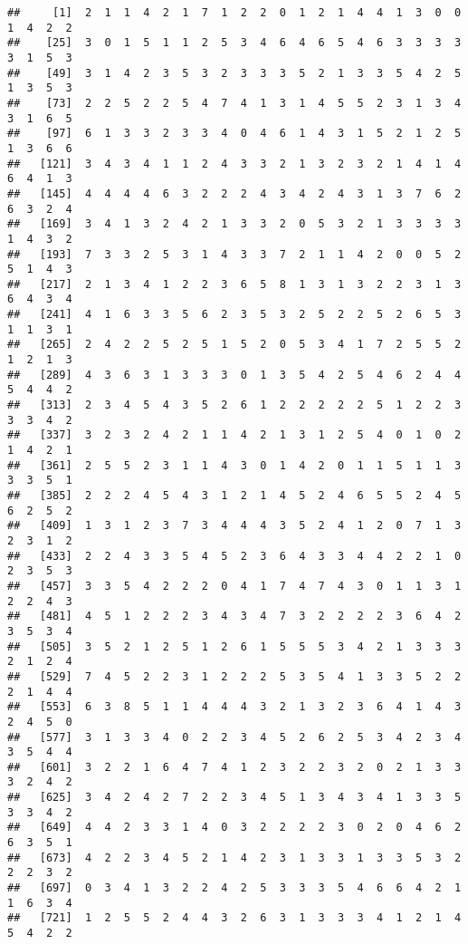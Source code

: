 \documentclass[
]{article}
\begin{document}
\begin{verbatim}
##     [1]  2  1  1  4  2  1  7  1  2  2  0  1  2  1  4  4  1  3  0  0  1  4  2  2
##    [25]  3  0  1  5  1  1  2  5  3  4  6  4  6  5  4  6  3  3  3  3  3  1  5  3
##    [49]  3  1  4  2  3  5  3  2  3  3  3  5  2  1  3  3  5  4  2  5  1  3  5  3
##    [73]  2  2  5  2  2  5  4  7  4  1  3  1  4  5  5  2  3  1  3  4  3  1  6  5
##    [97]  6  1  3  3  2  3  3  4  0  4  6  1  4  3  1  5  2  1  2  5  1  3  6  6
##   [121]  3  4  3  4  1  1  2  4  3  3  2  1  3  2  3  2  1  4  1  4  6  4  1  3
##   [145]  4  4  4  4  6  3  2  2  2  4  3  4  2  4  3  1  3  7  6  2  6  3  2  4
##   [169]  3  4  1  3  2  4  2  1  3  3  2  0  5  3  2  1  3  3  3  3  1  4  3  2
##   [193]  7  3  3  2  5  3  1  4  3  3  7  2  1  1  4  2  0  0  5  2  5  1  4  3
##   [217]  2  1  3  4  1  2  2  3  6  5  8  1  3  1  3  2  2  3  1  3  6  4  3  4
##   [241]  4  1  6  3  3  5  6  2  3  5  3  2  5  2  2  5  2  6  5  3  1  1  3  1
##   [265]  2  4  2  2  5  2  5  1  5  2  0  5  3  4  1  7  2  5  5  2  1  2  1  3
##   [289]  4  3  6  3  1  3  3  3  0  1  3  5  4  2  5  4  6  2  4  4  5  4  4  2
##   [313]  2  3  4  5  4  3  5  2  6  1  2  2  2  2  2  5  1  2  2  3  3  3  4  2
##   [337]  3  2  3  2  4  2  1  1  4  2  1  3  1  2  5  4  0  1  0  2  1  4  2  1
##   [361]  2  5  5  2  3  1  1  4  3  0  1  4  2  0  1  1  5  1  1  3  3  3  5  1
##   [385]  2  2  2  4  5  4  3  1  2  1  4  5  2  4  6  5  5  2  4  5  6  2  5  2
##   [409]  1  3  1  2  3  7  3  4  4  4  3  5  2  4  1  2  0  7  1  3  2  3  1  2
##   [433]  2  2  4  3  3  5  4  5  2  3  6  4  3  3  4  4  2  2  1  0  2  3  5  3
##   [457]  3  3  5  4  2  2  2  0  4  1  7  4  7  4  3  0  1  1  3  1  2  2  4  3
##   [481]  4  5  1  2  2  2  3  4  3  4  7  3  2  2  2  2  3  6  4  2  3  5  3  4
##   [505]  3  5  2  1  2  5  1  2  6  1  5  5  5  3  4  2  1  3  3  3  2  1  2  4
##   [529]  7  4  5  2  2  3  1  2  2  2  5  3  5  4  1  3  3  5  2  2  2  1  4  4
##   [553]  6  3  8  5  1  1  4  4  4  3  2  1  3  2  3  6  4  1  4  3  2  4  5  0
##   [577]  3  1  3  3  4  0  2  2  3  4  5  2  6  2  5  3  4  2  3  4  3  5  4  4
##   [601]  3  2  2  1  6  4  7  4  1  2  3  2  2  3  2  0  2  1  3  3  3  2  4  2
##   [625]  3  4  2  4  2  7  2  2  3  4  5  1  3  4  3  4  1  3  3  5  3  3  4  2
##   [649]  4  4  2  3  3  1  4  0  3  2  2  2  2  3  0  2  0  4  6  2  6  3  5  1
##   [673]  4  2  2  3  4  5  2  1  4  2  3  1  3  3  1  3  3  5  3  2  2  2  3  2
##   [697]  0  3  4  1  3  2  2  4  2  5  3  3  3  5  4  6  6  4  2  1  1  6  3  4
##   [721]  1  2  5  5  2  4  4  3  2  6  3  1  3  3  3  4  1  2  1  4  5  4  2  2

\end{verbatim}
\end{document}
